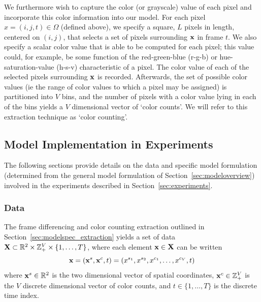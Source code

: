 \documentclass[smallcondensed, final]{svjour3}
\begin{document}
We furthermore wish to capture the color (or grayscale) value of each pixel and incorporate this color information into our model. For each pixel $x = (i, j, t) \in \Omega$ (defined above), we specify a square, $L$ pixels in length, centered on $(i, j)$, that selects a set of pixels surrounding $\bold{x}$ in frame $t$. We also specify a scalar color value that is able to be computed for each pixel; this value could, for example, be some function of the red-green-blue (r-g-b) or hue-saturation-value (h-s-v) characteristic of a pixel. The color value of each of the selected pixels surrounding $\bold{x}$ is recorded. Afterwards, the set of possible color values (ie the range of color values to which a pixel may be assigned) is partitioned into $V$ bins, and the number of pixels with a color value lying in each of the bins yields a $V$ dimensional vector of `color counts'. We will refer to this extraction technique as `color counting'.







\subsection{Model Implementation in Experiments}

The following sections provide details on the data and specific model formulation (determined from the general model formulation of Section~\ref{sec:modeloverview}) involved in the experiments described in Section~\ref{sec:experiments}.






\subsubsection{Data}

The frame differencing and color counting extraction outlined in Section~\ref{sec:modelspec_extraction} yields a set of data $\bold{X} \subset \mathbb{R}^{2} \times \mathbb{Z}_{+}^{V} \times \{1, \ldots, T \}$, where each element $\bold{x} \in \bold{X}$ can be written
\begin{equation}
\bold{x} = ( \bold{x}^{s}, \bold{x}^{c}, t ) = ( x^{s_{1}}, x^{s_{2}}, x^{c_{1}}, \ldots, x^{c_{V}}, t )
\end{equation}
where $\bold{x}^{s} \in \mathbb{R}^{2}$ is the two dimensional vector of spatial coordinates,  $\bold{x}^{c} \in \mathbb{Z}_{+}^{V}$ is the $V$ discrete dimensional vector of color counts, and $t \in \{1, \ldots, T \}$ is the discrete time index. 
\end{document}

